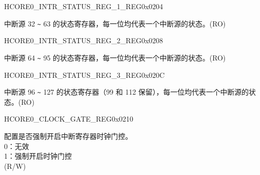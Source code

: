 \begin{register}{H}{CORE0\_INTR\_STATUS\_REG\_1\_REG}{0x0204}\label{regdesc:CORE0INTRSTATUSREG1REG}
%
\regnewline%
\begin{regdesc}\begin{reglist}
\label{fielddesc:CORE0INTRSTATUS1}\item [CORE0\_INTR\_STATUS\_1] 中断源 32 \verb+~+ 63 的状态寄存器，每一位均代表一个中断源的状态。(RO)
\end{reglist}\end{regdesc}
\end{register}


\begin{register}{H}{CORE0\_INTR\_STATUS\_REG\_2\_REG}{0x0208}\label{regdesc:CORE0INTRSTATUSREG2REG}
%
\regnewline%
\begin{regdesc}\begin{reglist}
\label{fielddesc:CORE0INTRSTATUS2}\item [CORE0\_INTR\_STATUS\_2] 中断源 64 \verb+~+ 95 的状态寄存器，每一位均代表一个中断源的状态。(RO)
\end{reglist}\end{regdesc}
\end{register}


\begin{register}{H}{CORE0\_INTR\_STATUS\_REG\_3\_REG}{0x020C}\label{regdesc:CORE0INTRSTATUSREG3REG}
%
\regnewline%
\begin{regdesc}\begin{reglist}
\label{fielddesc:CORE0INTRSTATUS3}\item [CORE0\_INTR\_STATUS\_3] 中断源 96 \verb+~+ 127 的状态寄存器（99 和 112 保留），每一位均代表一个中断源的状态。(RO)
\end{reglist}\end{regdesc}
\end{register}


\begin{register}{H}{CORE0\_CLOCK\_GATE\_REG}{0x0210}\label{regdesc:CORE0CLOCKGATEREG}
%
%
\regnewline%
\begin{regdesc}\begin{reglist}
\label{fielddesc:CORE0REGCLKEN}\item [CORE0\_REG\_CLK\_EN] 配置是否强制开启中断寄存器时钟门控。\\
0：无效 \\
1：强制开启时钟门控 \\
(R/W)
\end{reglist}\end{regdesc}
\end{register}

